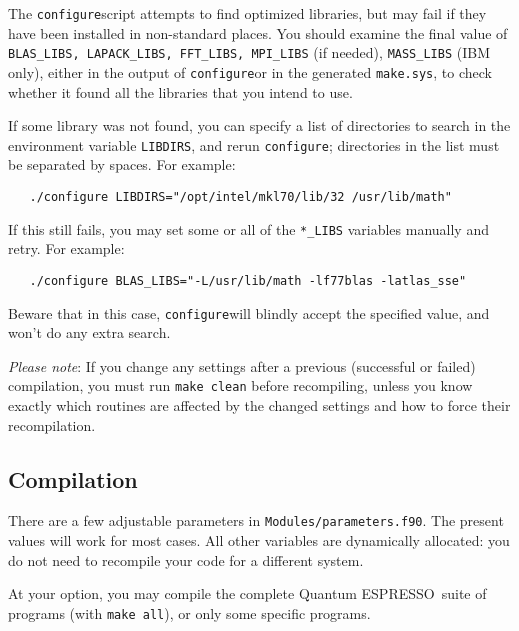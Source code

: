 \documentclass[12pt,a4paper]{article}
\def\qe{{\sc Quantum ESPRESSO}}
\def\configure{\texttt{configure}}
\begin{document}
The \configure script attempts to find optimized libraries, but may fail
if they have been installed in non-standard places. You should examine
the final value of \texttt{BLAS\_LIBS, LAPACK\_LIBS, FFT\_LIBS, MPI\_LIBS} (if needed),
\texttt{MASS\_LIBS} (IBM only), either in the output of \configure or in the generated
\texttt{make.sys}, to check whether it found all the libraries that you intend to use.
    
If some library was not found, you can specify a list of directories to search
in the environment variable \texttt{LIBDIRS}, 
and rerun \configure; directories in the
list must be separated by spaces. For example:
\begin{verbatim}
   ./configure LIBDIRS="/opt/intel/mkl70/lib/32 /usr/lib/math"
\end{verbatim}
If this still fails, you may set some or all of the \texttt{*\_LIBS} variables manually
and retry. For example:
\begin{verbatim}
   ./configure BLAS_LIBS="-L/usr/lib/math -lf77blas -latlas_sse"
\end{verbatim}
Beware that in this case, \configure will blindly accept the specified value,
and won't do any extra search. 
    
{\em Please note}: If you change any settings after a previous (successful or
failed) compilation, you must run \texttt{make clean} before recompiling, 
unless you
know exactly which routines are affected by the changed settings and how to
force their recompilation.

\subsection{Compilation}

There are a few adjustable parameters in \texttt{Modules/parameters.f90}. 
The
present values will work for most cases. All other variables are dynamically
allocated: you do not need to recompile your code for a different system.
    
At your option, you may compile the complete \qe\ suite of programs 
(with \texttt{make all}), or only some specific programs.
\end{document}
